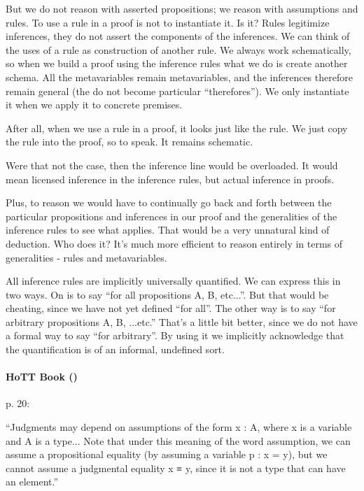 \documentclass{article}
\begin{document}
But we do not reason with asserted propositions; we reason with
assumptions and rules. To use a rule in a proof is not to instantiate
it. Is it? Rules legitimize inferences, they do not assert the
components of the inferences. We can think of the uses of a rule as
construction of another rule. We always work schematically, so when we
build a proof using the inference rules what we do is create another
schema. All the metavariables remain metavariables, and the inferences
therefore remain general (the do not become particular
``therefores''). We only instantiate it when we apply it to concrete
premises.

After all, when we use a rule in a proof, it looks just like the rule.
We just copy the rule into the proof, so to speak. It remains schematic.

Were that not the case, then the inference line would be overloaded.
It would mean licensed inference in the inference rules, but actual
inference in proofs.

Plus, to reason we would have to continually go back and forth between
the particular propositions and inferences in our proof and the
generalities of the inference rules to see what applies. That would be
a very unnatural kind of deduction. Who does it? It's much more
efficient to reason entirely in terms of generalities - rules and
metavariables.

All inference rules are implicitly universally quantified. We can
express this in two ways. On is to say ``for all propositions A, B,
etc...''. But that would be cheating, since we have not yet defined
``for all''. The other way is to say ``for arbitrary propositions A,
B, ...etc.'' That's a little bit better, since we do not have a formal
way to say ``for arbitrary''. By using it we implicitly acknowledge
that the quantification is of an informal, undefined sort.

\paragraph{HoTT Book (\parencite{hottbook})\newline}

p. 20:
\begin{displayquote}
``Judgments may depend on assumptions of the form x :
A, where x is a variable and A is a type... Note that under this
meaning of the word assumption, we can assume a propositional equality
(by assuming a variable p : x = y), but we cannot assume a judgmental
equality x ≡ y, since it is not a type that can have an element.''
\end{displayquote}
\end{document}
